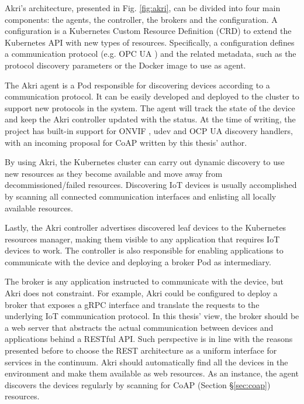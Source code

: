 Akri's architecture, presented in Fig. \ref{fig:akri}, can be divided into four main components: the agents, the controller, the brokers and the configuration. A configuration is a Kubernetes Custom Resource Definition (CRD) to extend the Kubernetes API with new types of resources. Specifically, a configuration defines a communication protocol (e.g. OPC UA \cite{gruner2016restful}) and the related metadata, such as the protocol discovery parameters or the Docker image to use as agent.

The Akri agent is a Pod responsible for discovering devices according to a communication protocol. It can be easily developed and deployed to the cluster to support new protocols in the system. The agent will track the state of the device and keep the Akri controller updated with the status. At the time of writing, the project has built-in support for ONVIF \cite{onvif}, udev \cite{udev} and OCP UA \cite{gruner2016restful} discovery handlers, with an incoming proposal for CoAP \cite{bormann2012coap} written by this thesis' author.

By using Akri, the Kubernetes cluster can carry out dynamic discovery to use new resources as they become available and move away from decommissioned/failed resources. Discovering IoT devices is usually accomplished by scanning all connected communication interfaces and enlisting all locally available resources.

Lastly, the Akri controller advertises discovered leaf devices to the Kubernetes resources manager, making them visible to any application that requires IoT devices to work. The controller is also responsible for enabling applications to communicate with the device and deploying a broker Pod as intermediary. 

The broker is any application instructed to communicate with the device, but Akri does not constraint. For example, Akri could be configured to deploy a broker that exposes a gRPC \cite{gRPC} interface and translate the requests to the underlying IoT communication protocol. In this thesis' view, the broker should be a web server that abstracts the actual communication between devices and applications behind a RESTful API. Such perspective is in line with the reasons presented before to choose the REST architecture as a uniform interface for services in the continuum. Akri should automatically find all the devices in the environment and make them available as web resources. As an instance, the agent discovers the devices regularly by scanning for CoAP (Section §\ref{sec:coap}) resources.

